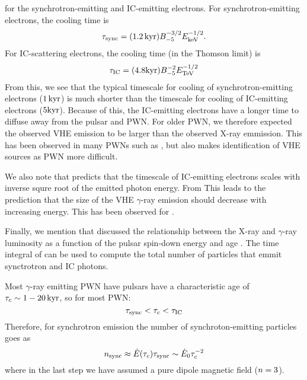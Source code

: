 for the synchrotron-emitting and \ac{IC}-emitting electrons.
For synchrotron-emitting electrons, the cooling time is
\begin{equation}
  \tau_\text{sync} = (1.2\,\text{k}\text{yr}) B_{-5}^{-3/2} E_\text{keV}^{-1/2}.
\end{equation}
For \ac{IC}-scattering electrons, the cooling time (in the Thomson limit) is
\begin{equation}
  \eqnlabel{ic_timescale}
  \lifetime_\text{IC} = (4.8\kyr) B_{-5}^{-2} \energy_\tev^{-1/2}
\end{equation}
From this, we see that the typical timescale for cooling of
synchrotron-emitting electrons ($1\,\text{k}\text{yr}$) is much shorter than
the timescale for cooling of \ac{IC}-emitting electrons ($5\text{k}\text{yr}$). Because
of this, the \ac{IC}-emitting electrons have a longer time to diffuse
away from the pulsar and \ac{PWN}.  For older \ac{PWN}, we therefore
expected the observed \ac{VHE} emission to be larger than the observed
X-ray emmission.  This has been observed in many \acp{PWN} such as
 \cite{aharonian_2006a_h.e.s.s.-survey}, but also makes
identification of \ac{VHE} sources as \ac{PWN} more difficult.

We also note that  predicts that the timescale
of \ac{IC}-emitting electrons scales with inverse squre root of
the emitted photon energy. From This leads to the prediction that
the size of the \ac{VHE} $\gamma$-ray emission should decrease
with increasing energy. This has been observed for 
\citep{aharonian_2006a_energy-dependent}.

Finally, we mention that \cite{mattana_2009_evolution-gamma-} discussed
the relationship between the X-ray and $\gamma$-ray luminosity as a
function of the pulsar spin-down energy \energydot and age \PulsarAge.
The time integral of  can be used to compute
the total number of particles that emmit synctrotron and \ac{IC} photons.

Most $\gamma$-ray emitting \ac{PWN} have pulsars have a characteristic
age of $\tau_c\sim1-20\,\text{k}\text{yr}$, so for most \ac{PWN}:
\begin{equation}
  \tau_\text{sync} < \tau_c < \tau_\text{IC}
\end{equation}
Therefore, for synchrotron emission the number of synchroton-emitting
particles goes as
\begin{equation}
  n_\text{sync} \approx \dot{E}(\tau_c) \tau_\text{sync} \sim \dot{E}_0 \tau_c^{-2}
\end{equation}
where in the last step we have assumed a pure dipole magnetic field
($n=3$).

